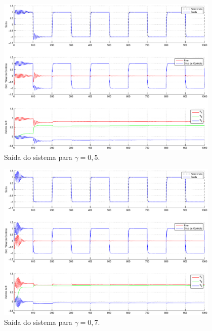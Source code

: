 \begin{figure}[H]
    \centering
    \includegraphics[width=0.95\textwidth]{imgs/questao3/saida_gamma_0.5.eps}
    \caption{Saída do sistema para $\gamma = 0,5$.}
    \label{fig:q3_saida_gamma_0.5}
\end{figure}

\begin{figure}[htb]
    \centering
    \includegraphics[width=0.95\textwidth]{imgs/questao3/saida_gamma_0.7.eps}
    \caption{Saída do sistema para $\gamma = 0,7$.}
    \label{fig:q3_saida_gamma_0.7}
\end{figure}

